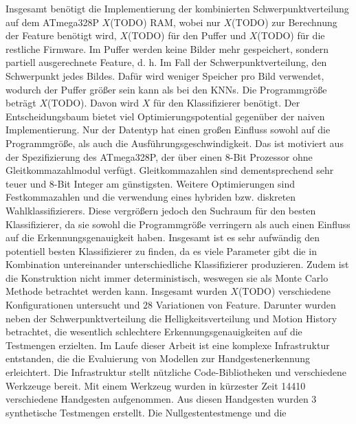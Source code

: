 \newline
\newline
Insgesamt benötigt die Implementierung der kombinierten Schwerpunktverteilung auf dem ATmega328P $X$(TODO) RAM, wobei nur $X$(TODO) zur Berechnung der Feature benötigt wird, $X$(TODO) für den Puffer und
$X$(TODO) für die restliche Firmware. Im Puffer werden keine Bilder mehr gespeichert, sondern partiell ausgerechnete Feature, d. h. Im Fall der Schwerpunktverteilung, den Schwerpunkt jedes Bildes.
Dafür wird weniger Speicher pro Bild verwendet, wodurch der Puffer größer sein kann als bei den KNNs. Die Programmgröße beträgt $X$(TODO). Davon wird $X$ für den Klassifizierer benötigt.
\newline
\newline
Der Entscheidungsbaum bietet viel Optimierungspotential gegenüber der naiven Implementierung. Nur der Datentyp hat einen großen Einfluss sowohl auf die Programmgröße, als auch die Ausführungsgeschwindigkeit.
Das ist motiviert aus der Spezifizierung des ATmega328P, der über einen 8-Bit Prozessor ohne Gleitkommazahlmodul verfügt. Gleitkommazahlen sind dementsprechend sehr teuer und 8-Bit Integer am günstigsten.
Weitere Optimierungen sind Festkommazahlen und die verwendung eines hybriden bzw. diskreten Wahlklassifizierers. Diese vergrößern jedoch den Suchraum für den besten Klassifizierer, da sie sowohl die
Programmgröße verringern als auch einen Einfluss auf die Erkennungsgenauigkeit haben.
\newline
\newline
Insgesamt ist es sehr aufwändig den potentiell besten Klassifizierer zu finden, da es viele Parameter gibt die in Kombination untereinander unterschiedliche Klassifizierer produzieren. Zudem ist die
Konstruktion nicht immer deterministisch, weswegen sie als Monte Carlo Methode betrachtet werden kann. Insgesamt wurden $X$(TODO) verschiedene Konfigurationen untersucht und $28$ Variationen von Feature.
Darunter wurden neben der Schwerpunktverteilung die Helligkeitsverteilung und Motion History betrachtet, die wesentlich schlechtere Erkennungsgenauigkeiten auf die Testmengen erzielten.
\newline
\newline
Im Laufe dieser Arbeit ist eine komplexe Infrastruktur entstanden, die die Evaluierung von Modellen zur Handgestenerkennung erleichtert. Die Infrastruktur stellt nützliche Code-Bibliotheken und verschiedene
Werkzeuge bereit. Mit einem Werkzeug wurden in kürzester Zeit 14410 verschiedene Handgesten aufgenommen. Aus diesen Handgesten wurden 3 synthetische Testmengen erstellt. Die Nullgestentestmenge und die
